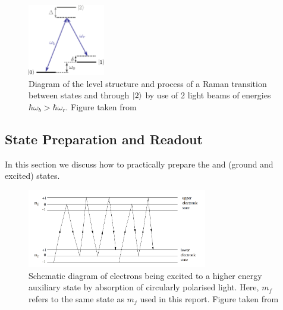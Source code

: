 \begin{figure}[H]
    \centering
    \includegraphics[width=0.3\textwidth]{images/TIQC_raman.jpg}
    \caption{Diagram of the level structure and process of a Raman transition between states \kz and \ko through $\ket{2}$ by use of 2 light beams of energies $\hbar \omega_b > \hbar \omega_r$. Figure taken from \cite{schaferFastGatesMixedSpecies2020}}\label{fig:TIQC_raman}
\end{figure}

\subsection{State Preparation and Readout}\label{sec:trappedreadout}


In this section we discuss how to practically prepare the \kz and \ko (ground and excited) states.  

\begin{figure}[H]
    \centering
    \includegraphics[width=0.7\textwidth]{images/States.png}
    \caption{Schematic diagram of electrons being excited to a higher energy auxiliary state by absorption of circularly polarised light. Here, $m_f$ refers to the same state as $m_j$ used in this report. Figure taken from \cite{JLExp11}}\label{fig:States}
\end{figure}

